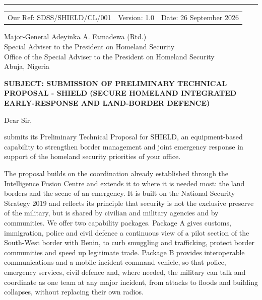 \documentclass[10pt,letterpaper]{article}
\begin{document}
\begin{center}
  \SDSSLogo[2.75in]\\[6pt]
  {\small \ContactLine}
\end{center}

\vspace{2pt}
{\color{SDSSNavy}\rule{\textwidth}{0.8pt}}
\vspace{5pt}

\begin{tabular*}{\textwidth}{@{\extracolsep{\fill}}lll}
  Our Ref: SDSS/SHIELD/CL/001 & Version: 1.0 & Date: 26 September 2026
\end{tabular*}

\vspace{7pt}
Major-General Adeyinka A. Famadewa (Rtd.)\\
Special Adviser to the President on Homeland Security\\
Office of the Special Adviser to the President on Homeland Security\\
Abuja, Nigeria

\vspace{7pt}
{\bfseries SUBJECT: SUBMISSION OF PRELIMINARY TECHNICAL PROPOSAL - SHIELD (SECURE HOMELAND INTEGRATED EARLY-RESPONSE AND LAND-BORDER DEFENCE)}

\vspace{4pt}
Dear Sir,

\CompanyShort{} submits its Preliminary Technical Proposal for SHIELD, an equipment-based capability to strengthen border management and joint emergency response in support of the homeland security priorities of your office.

The proposal builds on the coordination already established through the Intelligence Fusion Centre and extends it to where it is needed most: the land borders and the scene of an emergency. It is built on the National Security Strategy 2019 and reflects its principle that security is not the exclusive preserve of the military, but is shared by civilian and military agencies and by communities. We offer two capability packages. Package A gives customs, immigration, police and civil defence a continuous view of a pilot section of the South-West border with Benin, to curb smuggling and trafficking, protect border communities and speed up legitimate trade. Package B provides interoperable communications and a mobile incident command vehicle, so that police, emergency services, civil defence and, where needed, the military can talk and coordinate as one team at any major incident, from attacks to floods and building collapses, without replacing their own radios.
\end{document}
